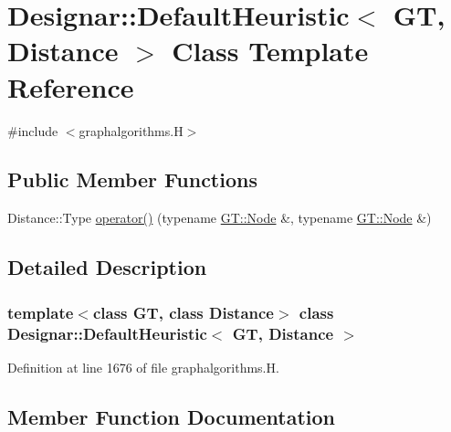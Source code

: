 \hypertarget{class_designar_1_1_default_heuristic}{}\section{Designar\+:\+:Default\+Heuristic$<$ GT, Distance $>$ Class Template Reference}
\label{class_designar_1_1_default_heuristic}


{\ttfamily \#include $<$graphalgorithms.\+H$>$}

\subsection*{Public Member Functions}
\begin{DoxyCompactItemize}
\item 
Distance\+::\+Type \hyperlink{class_designar_1_1_default_heuristic_ab4a8fc009f9235163ac5696d166b287f}{operator()} (typename \hyperlink{test-mtreenode_8_c_a17a24b0725f59987143c5faf63c4dc6f}{G\+T\+::\+Node} \&, typename \hyperlink{test-mtreenode_8_c_a17a24b0725f59987143c5faf63c4dc6f}{G\+T\+::\+Node} \&)
\end{DoxyCompactItemize}


\subsection{Detailed Description}
\subsubsection*{template$<$class GT, class Distance$>$\newline
class Designar\+::\+Default\+Heuristic$<$ G\+T, Distance $>$}



Definition at line 1676 of file graphalgorithms.\+H.



\subsection{Member Function Documentation}
\mbox{\label{class_designar_1_1_default_heuristic_ab4a8fc009f9235163ac5696d166b287f}} 
